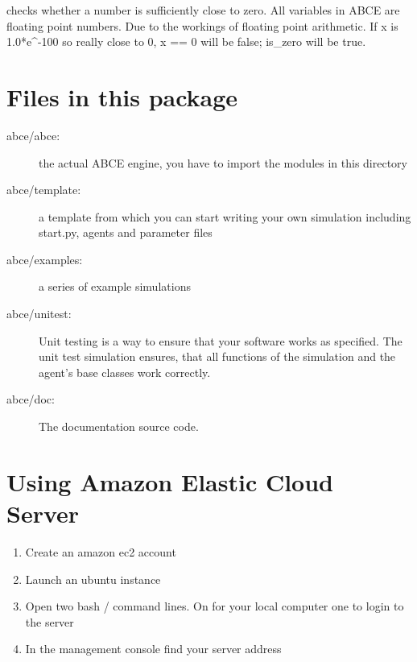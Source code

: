 \documentclass[letterpaper,10pt,english]{sphinxmanual}
\begin{document}

\begin{fulllineitems}
\label{abcetools:tools.is_zero}
checks whether a number is sufficiently close to zero. All variables
in ABCE are floating point numbers. Due to the workings of floating point
arithmetic. If x is 1.0*e\textasciicircum{}-100 so really close to 0, x == 0 will be false;
is\_zero will be true.

\end{fulllineitems}



\chapter{Files in this package}
\label{files:files-in-this-package}\label{files::doc}\begin{description}
\item[{abce/abce:}] \leavevmode
the actual ABCE engine, you have to import the modules in this directory

\item[{abce/template:}] \leavevmode
a template from which you can start writing your own simulation including start.py, agents and parameter files

\item[{abce/examples:}] \leavevmode
a series of example simulations

\item[{abce/unitest:}] \leavevmode
Unit testing is a way to ensure that your software works as specified. The unit test simulation ensures, that
all functions of the simulation and the agent's base classes work correctly.

\item[{abce/doc:}] \leavevmode
The documentation source code.

\end{description}


\chapter{Using Amazon Elastic Cloud Server}
\label{amazon_ec2:using-amazon-elastic-cloud-server}\label{amazon_ec2::doc}\begin{enumerate}
\item {} 
Create an amazon ec2 account

\item {} 
Launch an ubuntu instance

\item {} 
Open two bash / command lines. On for your local computer one to login to the server

\item {} 
In the management console find your server address

\end{enumerate}
\end{document}
